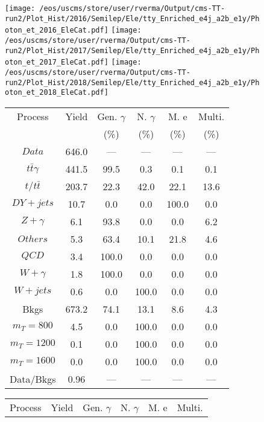 \begin{figure}
\centering
\texttt{[image: /eos/uscms/store/user/rverma/Output/cms-TT-run2/Plot\_Hist/2016/Semilep/Ele/tty\_Enriched\_e4j\_a2b\_e1y/Photon\_et\_2016\_EleCat.pdf]}
\texttt{[image: /eos/uscms/store/user/rverma/Output/cms-TT-run2/Plot\_Hist/2017/Semilep/Ele/tty\_Enriched\_e4j\_a2b\_e1y/Photon\_et\_2017\_EleCat.pdf]}
\texttt{[image: /eos/uscms/store/user/rverma/Output/cms-TT-run2/Plot\_Hist/2018/Semilep/Ele/tty\_Enriched\_e4j\_a2b\_e1y/Photon\_et\_2018\_EleCat.pdf]}
\begin{minipage}[c]{0.32\textwidth}
\centering
\tiny{
\begin{tabular}{cccccc}
\hline
Process & Yield & Gen. $\gamma$ & N. $\gamma$ & M. e & Multi. \\
 &  & (\%) & (\%) & (\%) & (\%)  \\
\hline
                                                                      $ Data $ &  646.0 &  --- &  --- &  --- &  ---\\
$ t\bar{t}\gamma $ &  441.5 &  99.5 &  0.3 &  0.1 &  0.1\\
$ t/t\bar{t} $ &  203.7 &  22.3 &  42.0 &  22.1 &  13.6\\
$ DY+jets $ &  10.7 &  0.0 &  0.0 &  100.0 &  0.0\\
$ Z+\gamma $ &  6.1 &  93.8 &  0.0 &  0.0 &  6.2\\
$ Others $ &  5.3 &  63.4 &  10.1 &  21.8 &  4.6\\
$ QCD $ &  3.4 &  100.0 &  0.0 &  0.0 &  0.0\\
$ W+\gamma $ &  1.8 &  100.0 &  0.0 &  0.0 &  0.0\\
$ W+jets $ &  0.6 &  0.0 &  100.0 &  0.0 &  0.0\\
Bkgs &  673.2 &  74.1 &  13.1 &  8.6 &  4.3\\
$ m_{T} = 800 $ &  4.5 &  0.0 &  100.0 &  0.0 &  0.0\\
$ m_{T} = 1200 $ &  0.1 &  0.0 &  100.0 &  0.0 &  0.0\\
$ m_{T} = 1600 $ &  0.0 &  0.0 &  100.0 &  0.0 &  0.0\\
Data/Bkgs &  0.96 &  --- &  --- &  --- &  ---\\
\hline
\end{tabular}
}
\end{minipage}
\begin{minipage}[c]{0.32\textwidth}
\centering
\tiny{
\begin{tabular}{cccccc}
\hline
Process & Yield & Gen. $\gamma$ & N. $\gamma$ & M. e & Multi. \\

\end{tabular}}
\end{minipage}
\end{figure}
